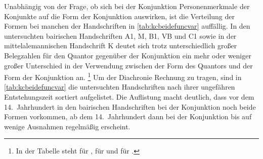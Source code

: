 Unabhängig von der Frage, ob sich bei der Konjunktion 
 Personenmerkmale der Konjunkte auf die Form der
Konjunktion auswirken, ist die Verteilung der Formen bei manchen der
Handschriften in \cref{tab:kcbeidefuncvar} auffällig. In den untersuchten
bairischen Handschriften A1, M, B1,
VB und C1 sowie in der mittelalemannischen Handschrift
K deutet sich trotz unterschiedlich großer Belegzahlen für den
Quantor gegenüber der Konjunktion ein mehr oder weniger großer Unterschied in
der Verwendung zwischen der Form des Quantors und der Form der Konjunktion an.%
%
	\footnote{In der Tabelle steht \q{--} für ,
	\q{(\chk)} für  und \q{\chk} für .}
%
Um der Diachronie Rechnung zu tragen, sind in \cref{tab:kcbeidefuncvar} die
untersuchten Handschriften nach ihrer ungefähren Entstehungszeit sortiert
aufgelistet. Die Auflistung macht deutlich, dass vor dem 14.~Jahrhundert in den
bairischen Handschriften bei der Konjunktion noch beide Formen vorkommen, ab
dem 14.~Jahrhundert dann bei der Konjunktion bis auf wenige Ausnahmen regelmäßig
 erscheint.

